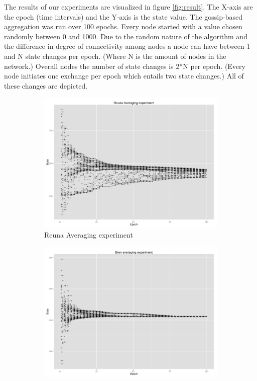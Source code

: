 The results of our experiments are visualized in figure \ref{fig:result}. The X-axis are the epoch (time intervals) and the Y-axis is the state value. The gossip-based aggregation was run over 100 epochs. Every node started with a value chosen randomly between 0 and 1000. Due to the random nature of the algorithm and the difference in degree of connectivity among nodes a node can have between 1 and N state changes per epoch. (Where N is the amount of nodes in the network.) Overall nodes the number of state changes is 2*N per epoch. (Every node initiates one exchange per epoch which entails two state changes.) All of these changes are depicted.
\begin{figure}[h!]
	\centering
    \begin{subfigure}[t]{0.47\textwidth}
    \vspace{0pt}
    \includegraphics[width=\linewidth]{figures/Reuna.png}
    \caption{Reuna Averaging experiment}
    \end{subfigure}
    \begin{subfigure}[t]{0.47\textwidth}
    \vspace{0pt}
    \includegraphics[width=\linewidth]{figures/Bren.png}

\end{subfigure}
\end{figure}
